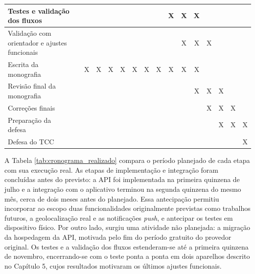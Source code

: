 \documentclass[a4paper, 12pt]{article}
\begin{document}
\begin{justify}
\begin{table}[H]
{\begin{tabular}{|l|c|c|c|c|c|c|c|c|c|c|c|c|c|c|c|}
Testes e validação dos fluxos 
&  &  &  &  &  &  &  &  & X & X & X &  &  &  &  \\
\hline

Validação com orientador e ajustes funcionais 
&  &  &  &  &  &  &  &  &  & X & X & X &  &  &  \\
\hline

Escrita da monografia 
&  & X & X & X & X & X & X & X & X & X & X &  &  &  &  \\
\hline

Revisão final da monografia 
&  &  &  &  &  &  &  &  &  &  & X & X & X &  &  \\
\hline

Correções finais 
&  &  &  &  &  &  &  &  &  &  &  & X & X & X &  \\
\hline

Preparação da defesa 
&  &  &  &  &  &  &  &  &  &  &  &  & X & X & X \\
\hline

Defesa do TCC
&  &  &  &  &  &  &  &  &  &  &  &  &  &  & X \\
\hline

\end{tabular}
}
\end{table}

A Tabela \ref{tab:cronograma_realizado} compara o período planejado de cada etapa com sua execução real. As etapas de implementação e integração foram concluídas antes do previsto: a API foi implementada na primeira quinzena de julho e a integração com o aplicativo terminou na segunda quinzena do mesmo mês, cerca de dois meses antes do planejado. Essa antecipação permitiu incorporar ao escopo duas funcionalidades originalmente previstas como trabalhos futuros, a geolocalização real e as notificações \textit{push}, e antecipar os testes em dispositivo físico. Por outro lado, surgiu uma atividade não planejada: a migração da hospedagem da API, motivada pelo fim do período gratuito do provedor original. Os testes e a validação dos fluxos estenderam-se até a primeira quinzena de novembro, encerrando-se com o teste ponta a ponta em dois aparelhos descrito no Capítulo 5, cujos resultados motivaram os últimos ajustes funcionais.


\end{justify}
\end{document}
